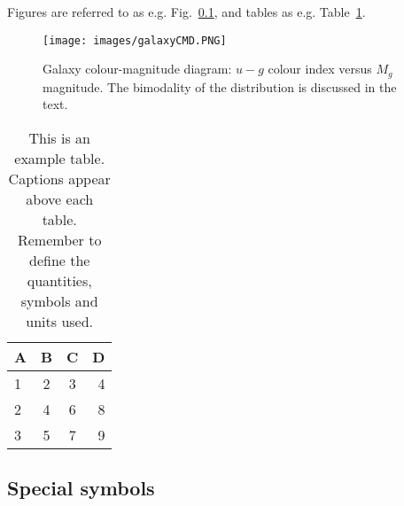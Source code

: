 
Figures are referred to as e.g. Fig.~\ref{}, and tables as e.g. Table~\ref{tab:example_table}.

\begin{figure}
	\texttt{[image: images/galaxyCMD.PNG]}
    \caption{Galaxy colour-magnitude diagram: $u-g$ colour index versus $M_g$ magnitude. The bimodality of the distribution is discussed in the text.}
    \label{fig:CMD1}
\end{figure}

\begin{table}
	\centering
	\caption{This is an example table. Captions appear above each table.
	Remember to define the quantities, symbols and units used.}
	\label{tab:example_table}
	\begin{tabular}{lccr} %
		\hline
		A & B & C & D\\
		\hline
		1 & 2 & 3 & 4\\
		2 & 4 & 6 & 8\\
		3 & 5 & 7 & 9\\
		\hline
	\end{tabular}
\end{table}

\subsection{Special symbols}



